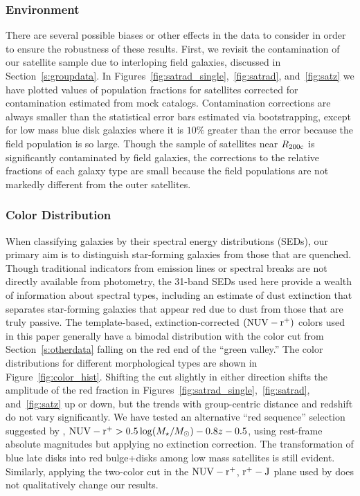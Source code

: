 \documentclass[12pt]{emulateapj}
\newcommand{\nuvr}{{$(\rm{NUV} - r^+)$ }}
\begin{document}
\subsubsection{Environment}

There are several possible biases or other effects in the data to
consider in order to ensure the robustness of these results. First, we
revisit the contamination of our satellite sample due to interloping
field galaxies, discussed in Section~\ref{s:groupdata}. In
Figures~\ref{fig:satrad_single},~\ref{fig:satrad}, and~\ref{fig:satz} we
have plotted values of population fractions for satellites corrected for contamination estimated
from mock catalogs. Contamination corrections are always smaller
than the statistical error bars estimated via bootstrapping, except
for low mass blue disk galaxies where it is $10\%$ greater than the
error because the field population is so large. Though the sample of satellites near $R_{\rm 200c}$ is
significantly contaminated by field galaxies, the corrections to the
relative fractions of each galaxy type are small because the field
populations are not markedly different from the outer satellites.

\subsubsection{Color Distribution}

When classifying galaxies by their spectral energy distributions (SEDs), our primary aim
is to distinguish star-forming galaxies from those that are
quenched. Though traditional indicators from emission lines or
spectral breaks are not directly available from photometry, the 31-band SEDs
used here provide a wealth of information about spectral types,
including an estimate of dust extinction that separates star-forming
galaxies that appear red due to dust from those that are truly
passive. The template-based, extinction-corrected \nuvr colors used in
this paper generally have a bimodal distribution with the color cut
from Section~\ref{s:otherdata} falling on the red end of the ``green
valley.'' The color distributions for different morphological types
are shown in Figure~\ref{fig:color_hist}. Shifting the cut slightly in
either direction shifts the amplitude of the red fraction in
Figures~\ref{fig:satrad_single},~\ref{fig:satrad}, and~\ref{fig:satz}
up or down, but the trends with group-centric distance and redshift do
not vary significantly. We have tested an alternative ``red sequence''
selection suggested by \citet{Ilbert2010}, ${\rm NUV - r^+} >
0.5\log(M_{\star}/M_{\odot}) - 0.8 z - 0.5$, using rest-frame absolute
magnitudes but applying no extinction correction. The transformation
of blue late disks into red bulge+disks among low mass satellites is
still evident. Similarly, applying the two-color cut in the ${\rm NUV
  - r^+}$, ${\rm r^+ - J}$ plane used by \citet{Bundy2010} does not
qualitatively change our results.
\end{document}
